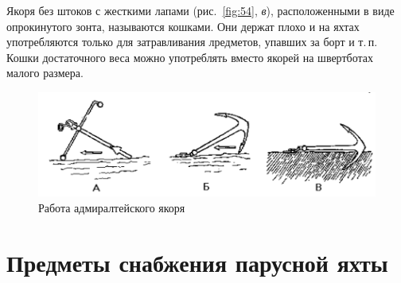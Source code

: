 \documentclass[a4paper, 12pt, twoside, final]{scrbook}
\begin{document}
Якоря без штоков с жесткими лапами (рис.~\ref{fig:54}, \textit{в}), расположенными в виде опрокинутого зонта, называются кошками. Они держат плохо и на яхтах употребляются только для затравливания лредметов, упавших за борт и т.\,п. Кошки достаточного веса можно употреблять вместо якорей на швертботах малого размера.

\begin{figure}[htbp]
   \centering
   \includegraphics{pics/53_Rabota_admiraltejskogo_jakorja} %
   \caption{Работа адмиралтейского якоря}
   \label{fig:53}
\end{figure}

\section{Предметы снабжения парусной яхты}
\end{document}
